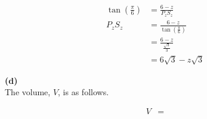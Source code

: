 \documentclass{article}
\begin{document}
    \begin{align*}
        \tan{\left(\frac{\pi}{6}\right)}    &= \frac{6-z}{P_z S_z} \\
        P_z S_z                             &= \frac{6-z}{\tan{\left(\frac{\pi}{6}\right)}} \\
                                            &= \frac{6-z}{\frac{\sqrt{3}}{3}} \\
                                            &= 6\sqrt{3} -z\sqrt{3}
    \end{align*}

    \textbf{(d)} \\
    The volume, $V$, is as follows.

    \begin{align*}
        V   &= 
    \end{align*}
\end{document}

